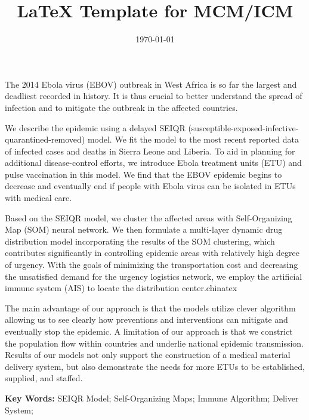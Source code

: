 \documentclass{mcmthesis}
\title{\LaTeX{} Template for MCM/ICM }
\author{\team}
\date{\today}
\begin{document}
\begin{summary}
The 2014 Ebola virus (EBOV) outbreak in West Africa is so far the largest and
deadliest recorded in history. It is thus crucial to better understand the spread
of infection and to mitigate the outbreak in the affected countries.

We describe the epidemic using a delayed SEIQR
(susceptible-exposed-infective-quarantined-removed) model.
We fit the model to the most recent reported data of infected cases and deaths in Sierra Leone and Liberia.
To aid in planning for additional disease-control efforts,
we introduce Ebola treatment units (ETU) and pulse vaccination in this model.
We find that the EBOV epidemic begins to decrease and eventually end if people with Ebola
virus can be isolated in ETUs with medical care.

Based on the SEIQR model, we cluster the affected areas with Self-Organizing Map (SOM) neural network.
We then formulate a multi-layer dynamic drug distribution model incorporating the results of the SOM
clustering, which contributes significantly in controlling epidemic areas with
relatively high degree of urgency. With the goals of minimizing the
transportation cost and decreasing the unsatisfied demand for the urgency
logistics network, we employ the artificial immune system (AIS) to locate the
distribution center.chinatex

The main advantage of our approach is that the models utilize clever
algorithm allowing us to see clearly how preventions and interventions can
mitigate and eventually stop the epidemic. A limitation of our approach is
that we constrict the population flow within countries and underlie national
epidemic transmission. Results of our models not only support the
construction of a medical material delivery system, but also demonstrate the
needs for more ETUs to be established, supplied, and staffed.

\noindent
\textbf{Key Words:}
SEIQR Model; Self-Organizing Maps; Immune Algorithm; Deliver System;

\end{summary}


\maketitle



%
\end{document}
